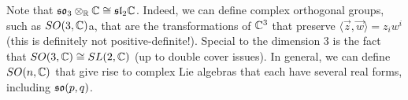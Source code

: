\documentclass{../mathnotes}
\begin{document}
\begin{exmp}
    Note that $\mathfrak{so}_3\otimes_{\mathbb{R}}\mathbb{C}\cong\mathfrak{sl}_2\mathbb{C}$. Indeed, we can define complex orthogonal groups, such as $SO(3,\mathbb{C})$a, that are the transformations
    of $\mathbb{C}^3$ that preserve $\langle\vec z,\vec w\rangle=z_iw^i$ (this is definitely not positive-definite!). Special to the dimension 3 is the fact that
    $SO(3,\mathbb{C})\cong SL(2,\mathbb{C})$ (up to double cover issues). In general, we can define $SO(n,\mathbb{C})$ that give rise to complex Lie algebras that each have
    several real forms, including $\mathfrak{so}(p,q)$.
\end{exmp}
\end{document}
